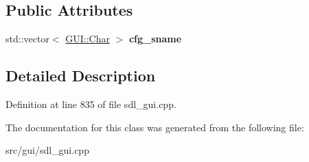 \subsection*{Public Attributes}
\begin{DoxyCompactItemize}
\item 
\hypertarget{classAutoexecEditor_af1d96f7032869aac93bba3fae830c902}{std\-::vector$<$ \hyperlink{namespaceGUI_af6b04b46d40197b4f00e553d7d1a3e4c}{G\-U\-I\-::\-Char} $>$ {\bfseries cfg\-\_\-sname}}\label{classAutoexecEditor_af1d96f7032869aac93bba3fae830c902}

\end{DoxyCompactItemize}


\subsection{Detailed Description}


Definition at line 835 of file sdl\-\_\-gui.\-cpp.



The documentation for this class was generated from the following file\-:\begin{DoxyCompactItemize}
\item 
src/gui/sdl\-\_\-gui.\-cpp\end{DoxyCompactItemize}
